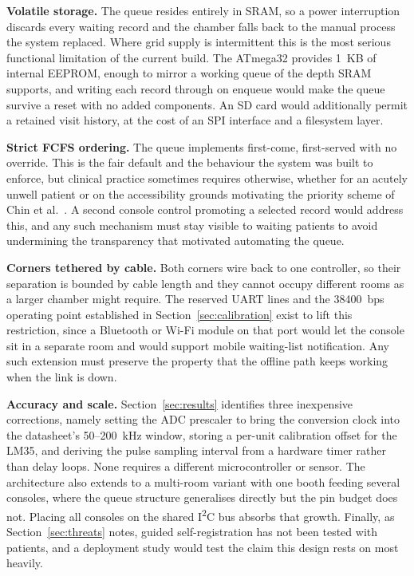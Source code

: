 \textbf{Volatile storage.} The queue resides entirely in SRAM, so a power interruption discards every
waiting record and the chamber falls back to the manual process the system replaced. Where grid supply
is intermittent this is the most serious functional limitation of the current build. The ATmega32
provides 1~KB of internal EEPROM, enough to mirror a working queue of the depth SRAM supports, and
writing each record through on enqueue would make the queue survive a reset with no added components.
An SD card would additionally permit a retained visit history, at the cost of an SPI interface and a
filesystem layer.

\textbf{Strict FCFS ordering.} The queue implements first-come, first-served with no override. This
is the fair default and the behaviour the system was built to enforce, but clinical practice
sometimes requires otherwise, whether for an acutely unwell patient or on the accessibility grounds
motivating the priority scheme of Chin et al.~\cite{arpn2019}. A second console control promoting a
selected record would address this, and any such mechanism must stay visible to waiting patients to
avoid undermining the transparency that motivated automating the queue.

\textbf{Corners tethered by cable.} Both corners wire back to one controller, so their separation is
bounded by cable length and they cannot occupy different rooms as a larger chamber might require.
The reserved UART lines and the 38400~bps operating point established in
Section~\ref{sec:calibration} exist to lift this restriction, since a Bluetooth or Wi-Fi module on
that port would let the console sit in a separate room and would support mobile waiting-list
notification. Any such extension must preserve the property that the offline path keeps working
when the link is down.

\textbf{Accuracy and scale.} Section~\ref{sec:results} identifies three inexpensive corrections, namely
setting the ADC prescaler to bring the conversion clock into the datasheet's 50--200~kHz window,
storing a per-unit calibration offset for the LM35, and deriving the pulse sampling interval from a
hardware timer rather than delay loops. None requires a different microcontroller or sensor. The
architecture also extends to a multi-room variant with one booth feeding several consoles, where the
queue structure generalises directly but the pin budget does not. Placing all consoles on the shared
I\textsuperscript{2}C bus absorbs that growth. Finally, as Section~\ref{sec:threats} notes, guided
self-registration has not been tested with patients, and a deployment study would test the claim this
design rests on most heavily.
